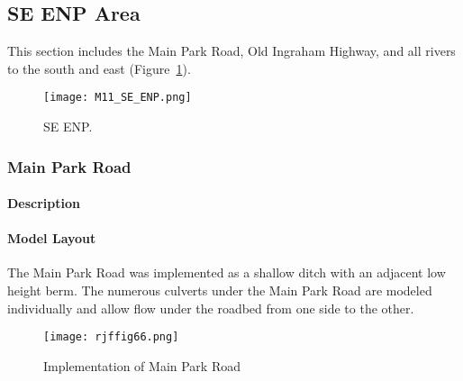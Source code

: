 \clearpage






\subsection{SE ENP Area}
This section includes the Main Park Road, Old Ingraham Highway, and all rivers to the south and east (Figure~\ref{fig:M11_SE_ENP}).

\begin{figure}[!h]
  \begin{center}
  \texttt{[image: M11\_SE\_ENP.png]}
  \caption{SE ENP.}
  \label{fig:M11_SE_ENP}
  \end{center}
\end{figure}

\clearpage
\subsubsection{Main Park Road}

\paragraph{Description}

\paragraph{Model Layout}
The Main Park Road was implemented as a shallow ditch with an adjacent low height berm. The numerous culverts under the Main Park Road are modeled individually and allow flow under the roadbed from one side to the other.

\begin{figure}[!h]
  \begin{center}
  \texttt{[image: rjffig66.png]}
  \caption{Implementation of Main Park Road}
  \label{fig:rjffig66}
  \end{center}
\end{figure}

